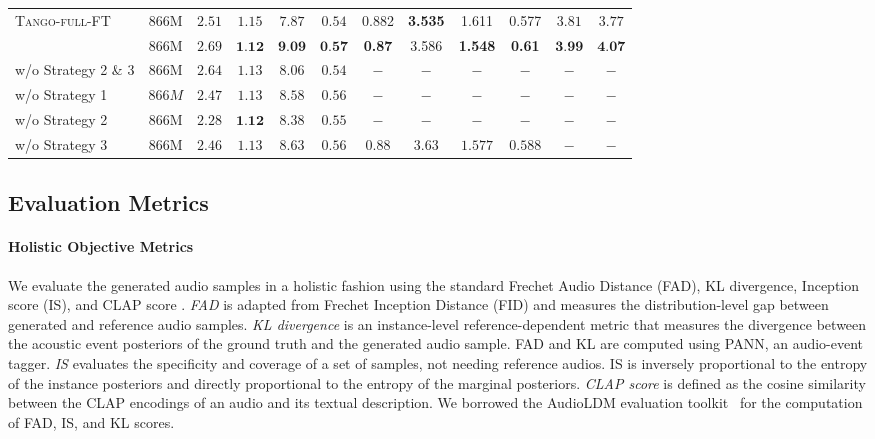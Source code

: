\begin{table*}[t]
\begin{tabular}{l|c|cccc|cccc|cc}
\textsc{Tango-full-FT}  & $866$M & $2.51$ & $1.15$ & $7.87$ & $0.54$ & 0.882 & \bf 3.535 & 1.611 & 0.577 & $3.81$ & $3.77$  \\
\model{}  & $866$M & $2.69$ & $\textbf{1.12}$ & $\textbf{9.09}$ & $\textbf{0.57}$ & \bf 0.87 & 3.586 & \bf 1.548 & \bf 0.61 & $\textbf{3.99}$ & $\textbf{4.07}$  \\
\quad w/o Strategy 2 \& 3   & $866$M & $2.64$ & $1.13$ & $8.06$ & $0.54$  & $-$ & $-$ & $-$ & $-$ & $-$ & $-$  \\
\quad w/o Strategy 1   & $866M$ & $2.47$ & $1.13$ & $8.58$ & $0.56$  & $-$ & $-$ & $-$ & $-$ & $-$ & $-$  \\
\quad w/o Strategy 2   & $866$M & $2.28$ & $\textbf{1.12}$ & $8.38$ & $0.55$  & $-$ & $-$ & $-$ & $-$ & $-$ & $-$  \\
\quad w/o Strategy 3   & $866$M & $2.46$ & $1.13$ & $8.63$ & $0.56$  & $0.88$ & $3.63$ & $1.577$ & $0.588$ & $-$ & $-$  \\
\bottomrule
\end{tabular}
\label{tab:main-results}
\end{table*}

\subsection{Evaluation Metrics}

\paragraph{\bf Holistic Objective Metrics} We evaluate the generated audio samples in a holistic fashion using the standard Frechet Audio Distance (FAD), KL divergence, Inception score (IS), and CLAP score \cite{liu2023audioldm}. \emph{FAD} is adapted from Frechet Inception Distance (FID) and measures the distribution-level gap between generated and reference audio samples. \emph{KL divergence} is an instance-level reference-dependent metric that measures the divergence between the acoustic event posteriors of the ground truth and the generated audio sample. FAD and KL are computed using PANN, an audio-event tagger. \emph{IS} evaluates the specificity and coverage of a set of samples, not needing reference audios. IS is inversely proportional to the entropy of the instance posteriors and directly proportional to the entropy of the marginal posteriors. \emph{CLAP score} is defined as the cosine similarity between the CLAP encodings of an audio and its textual description. We borrowed the AudioLDM evaluation toolkit~\cite{liu2023audioldm} for the computation of FAD, IS, and KL scores.

